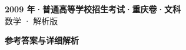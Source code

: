 \documentclass[zihao=-4, a4paper]{ctexart}
\begin{document}
\begin{center}
  {\Large\bfseries 2009 年·普通高等学校招生考试·重庆卷·文科}\\[4pt]
  {\large 数学 · 解析版}
\end{center}
\medskip
{}

\clearpage
{}
\begin{center}{\Large\bfseries 参考答案与详细解析}\end{center}
\medskip

\end{document}
